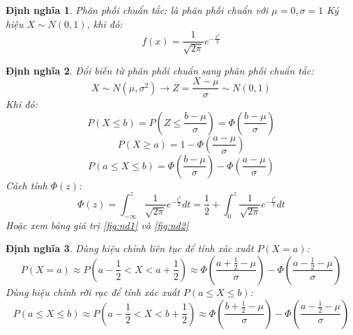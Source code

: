 \documentclass[12pt]{article}
\newtheorem{thm}{Định nghĩa}
\begin{document}
\begin{thm}
    Phân phối chuẩn tắc: là phân phối chuẩn với $\mu = 0, \sigma = 1$ Ký hiệu $X \sim N(0, 1)$, khi đó:
    \begin{equation}
        f(x) = \frac{1}{\sqrt{2\pi}}e^{-\frac{x^2}{2}}
    \end{equation}
\end{thm}
\begin{thm}
    Đổi biến từ phân phối chuẩn sang phân phối chuẩn tắc:
    \begin{equation}
        X \sim N(\mu, \sigma^2) \rightarrow Z = \frac{X - \mu}{\sigma} \sim N(0, 1)
    \end{equation}
    Khi đó:
    \begin{equation}
        P(X \leq b) = P(Z \leq \frac{b - \mu}{\sigma}) = \Phi(\frac{b - \mu}{\sigma})
    \end{equation}
    \begin{equation}
        P(X \geq a) = 1 - \Phi(\frac{a - \mu}{\sigma})
    \end{equation}
    \begin{equation}
        P(a \leq X \leq b) = \Phi(\frac{b - \mu}{\sigma}) - \Phi(\frac{a - \mu}{\sigma})
    \end{equation}
    Cách tính $\Phi(z)$:
    \begin{equation}
        \Phi(z) = \int_{-\infty}^z \frac{1}{\sqrt{2\pi}}e^{-\frac{t^2}{2}}dt = \frac{1}{2} + \int_{0}^z \frac{1}{\sqrt{2\pi}}e^{-\frac{t^2}{2}}dt
    \end{equation}
    Hoặc xem bảng giá trị \ref{fig:nd1} và \ref{fig:nd2}
\end{thm}

\begin{thm}
    Dùng hiệu chỉnh liên tục để tính xác xuất $P(X =a)$:
    \begin{equation}
        P(X = a) \approx P(a - \frac{1}{2} < X < a + \frac{1}{2}) \approx \Phi(\frac{a + \frac{1}{2} - \mu}{\sigma}) - \Phi(\frac{a - \frac{1}{2} - \mu}{\sigma})
    \end{equation}
    Dùng hiệu chỉnh rời rạc để tính xác xuất $P( a \leq X \leq b)$:
    \begin{equation}
        P(a \leq X \leq b) \approx P(a - \frac{1}{2} < X < b + \frac{1}{2}) \approx \Phi(\frac{b + \frac{1}{2} - \mu}{\sigma}) - \Phi(\frac{a - \frac{1}{2} - \mu}{\sigma})
    \end{equation}

\end{thm}
\end{document}

